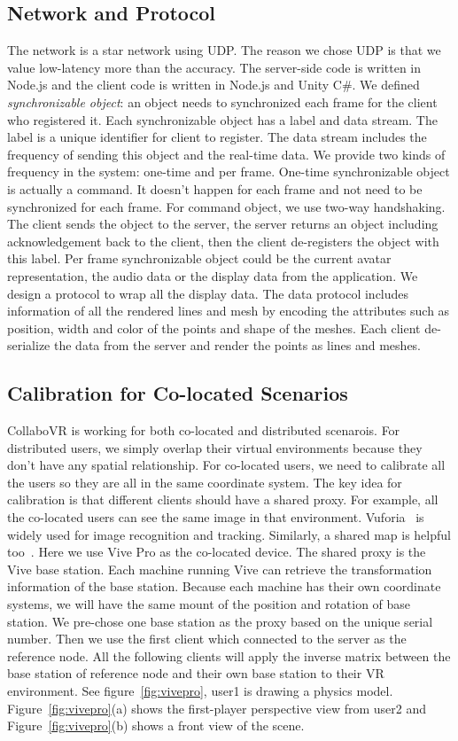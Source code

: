 \documentclass{sigchi}
\begin{document}
\subsection{Network and Protocol}
The network is a star network using UDP. The reason we chose UDP is that we value low-latency more than the accuracy. The server-side code is written in Node.js and the client code is written in Node.js and Unity C\#. We defined \textit{synchronizable object}: an object needs to synchronized each frame for the client who registered it. Each synchronizable object has a label and data stream. The label is a unique identifier for client to register. The data stream includes the frequency of sending this object and the real-time data. We provide two kinds of frequency in the system: one-time and per frame. One-time synchronizable object is actually a command. It doesn't happen for each frame and not need to be synchronized for each frame. For command object, we use two-way handshaking. The client sends the object to the server, the server returns an object including acknowledgement back to the client, then the client de-registers the object with this label. Per frame synchronizable object could be the current avatar representation, the audio data or the display data from the application. We design a protocol to wrap all the display data. The data protocol includes information of all the rendered lines and mesh by encoding the attributes such as position, width and color of the points and shape of the meshes. Each client de-serialize the data from the server and render the points as lines and meshes.

\subsection{Calibration for Co-located Scenarios}
CollaboVR is working for both co-located and distributed scenarois. For distributed users, we simply overlap their virtual environments because they don't have any spatial relationship. For co-located users, we need to calibrate all the users so they are all in the same coordinate system. The key idea for calibration is that different clients should have a shared proxy. For example, all the co-located users can see the same image in that environment. Vuforia~\cite{Vuforia} is widely used for image recognition and tracking. Similarly, a shared map is helpful too~\cite{Hololens}. Here we use Vive Pro as the co-located device. The shared proxy is the Vive base station. Each machine running Vive can retrieve the transformation information of the base station. Because each machine has their own coordinate systems, we will have the same mount of the position and rotation of base station. We pre-chose one base station as the proxy based on the unique serial number. Then we use the first client which connected to the server as the reference node. All the following clients will apply the inverse matrix between the base station of reference node and their own base station to their VR environment. See figure~\ref{fig:vivepro}, user1 is drawing a physics model. Figure~\ref{fig:vivepro}(a) shows the first-player perspective view from user2 and Figure~\ref{fig:vivepro}(b) shows a front view of the scene.
\end{document}
